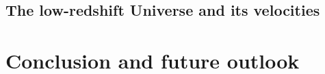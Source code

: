 \documentclass[a4paper, 11pt, twoside]{book}
\begin{document}
	\begin{refsection}
		\chapter{The low-redshift Universe and its velocities }
		\label{chap:velocities}
		
		\printbibliography[heading=subbibintoc]
	\end{refsection}

	
	\chapter*{Conclusion and future outlook}
	
	

	\appendix



\end{document}
